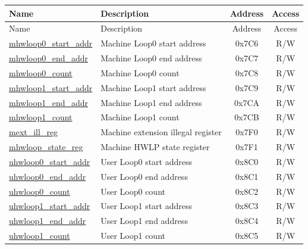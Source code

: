 \begin{longtable}{ | p{4.0cm} | p{8.4cm} | c | c| }
\hline\rowcolor{lightgray}
Name & Description & Address & Access \\ \hline
\endfirsthead
\hline
\rowcolor{lightgray}
Name & Description & Address & Access  \\
\hline
\endhead
\endfoot
\hyperref[sec:riscvcpu-hwloop-reg-desc]{mhwloop0\_start\_addr} & Machine Loop0 start address & 0x7C6 & R/W \\\hline
\hyperref[sec:riscvcpu-hwloop-reg-desc]{mhwloop0\_end\_addr} & Machine Loop0 end address & 0x7C7 & R/W \\\hline
\hyperref[sec:riscvcpu-hwloop-reg-desc]{mhwloop0\_count} & Machine Loop0 count & 0x7C8 & R/W \\\hline
\hyperref[sec:riscvcpu-hwloop-reg-desc]{mhwloop1\_start\_addr} & Machine Loop1 start address & 0x7C9 & R/W \\\hline
\hyperref[sec:riscvcpu-hwloop-reg-desc]{mhwloop1\_end\_addr} & Machine Loop1 end address & 0x7CA & R/W \\\hline
\hyperref[sec:riscvcpu-hwloop-reg-desc]{mhwloop1\_count} & Machine Loop1 count & 0x7CB & R/W \\\hline
\hyperref[sec:riscvcpu-hwloop-reg-desc]{mext\_ill\_reg} & Machine extension illegal register & 0x7F0 & R/W \\\hline
\hyperref[sec:riscvcpu-hwloop-reg-desc]{mhwloop\_state\_reg} & Machine HWLP state register & 0x7F1 & R/W \\\hline
\hyperref[sec:riscvcpu-hwloop-reg-desc]{uhwloop0\_start\_addr} & User Loop0 start address & 0x8C0 & R/W \\\hline
\hyperref[sec:riscvcpu-hwloop-reg-desc]{uhwloop0\_end\_addr} & User Loop0 end address & 0x8C1 & R/W \\\hline
\hyperref[sec:riscvcpu-hwloop-reg-desc]{uhwloop0\_count} & User Loop0 count & 0x8C2 & R/W \\\hline
\hyperref[sec:riscvcpu-hwloop-reg-desc]{uhwloop1\_start\_addr} & User Loop1 start address & 0x8C3 & R/W \\\hline
\hyperref[sec:riscvcpu-hwloop-reg-desc]{uhwloop1\_end\_addr} & User Loop1 end address & 0x8C4 & R/W \\\hline
\hyperref[sec:riscvcpu-hwloop-reg-desc]{uhwloop1\_count} & User Loop1 count & 0x8C5 & R/W \\\hline

\end{longtable}
